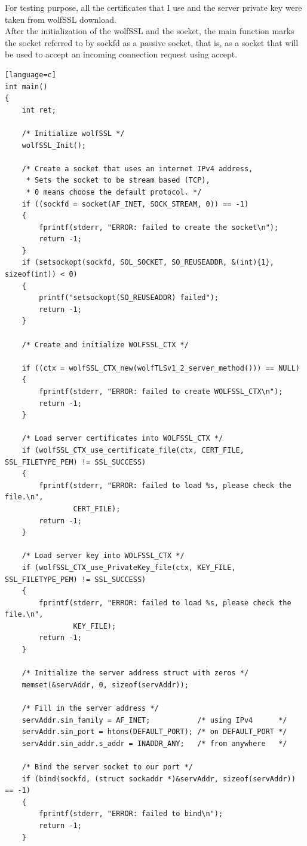 \documentclass[a4paper,12pt]{article}
\begin{document}
For testing purpose, all the certificates that I use and the server private key were taken from wolfSSL download.
\\After the initialization of the wolfSSL and the socket, the main function marks the socket referred to by sockfd as a passive socket, that is, as a socket that will be used to accept an incoming connection request using accept.
\begin{lstlisting}[caption={int main() of iterative TLS server},captionpos=b][language=c]
int main()
{
    int ret;

    /* Initialize wolfSSL */
    wolfSSL_Init();

    /* Create a socket that uses an internet IPv4 address,
     * Sets the socket to be stream based (TCP),
     * 0 means choose the default protocol. */
    if ((sockfd = socket(AF_INET, SOCK_STREAM, 0)) == -1)
    {
        fprintf(stderr, "ERROR: failed to create the socket\n");
        return -1;
    }
    if (setsockopt(sockfd, SOL_SOCKET, SO_REUSEADDR, &(int){1}, sizeof(int)) < 0)
    {
        printf("setsockopt(SO_REUSEADDR) failed");
        return -1;
    }

    /* Create and initialize WOLFSSL_CTX */

    if ((ctx = wolfSSL_CTX_new(wolfTLSv1_2_server_method())) == NULL)
    {
        fprintf(stderr, "ERROR: failed to create WOLFSSL_CTX\n");
        return -1;
    }

    /* Load server certificates into WOLFSSL_CTX */
    if (wolfSSL_CTX_use_certificate_file(ctx, CERT_FILE, SSL_FILETYPE_PEM) != SSL_SUCCESS)
    {
        fprintf(stderr, "ERROR: failed to load %s, please check the file.\n",
                CERT_FILE);
        return -1;
    }

    /* Load server key into WOLFSSL_CTX */
    if (wolfSSL_CTX_use_PrivateKey_file(ctx, KEY_FILE, SSL_FILETYPE_PEM) != SSL_SUCCESS)
    {
        fprintf(stderr, "ERROR: failed to load %s, please check the file.\n",
                KEY_FILE);
        return -1;
    }

    /* Initialize the server address struct with zeros */
    memset(&servAddr, 0, sizeof(servAddr));

    /* Fill in the server address */
    servAddr.sin_family = AF_INET;           /* using IPv4      */
    servAddr.sin_port = htons(DEFAULT_PORT); /* on DEFAULT_PORT */
    servAddr.sin_addr.s_addr = INADDR_ANY;   /* from anywhere   */

    /* Bind the server socket to our port */
    if (bind(sockfd, (struct sockaddr *)&servAddr, sizeof(servAddr)) == -1)
    {
        fprintf(stderr, "ERROR: failed to bind\n");
        return -1;
    }


\end{lstlisting}
\end{document}
